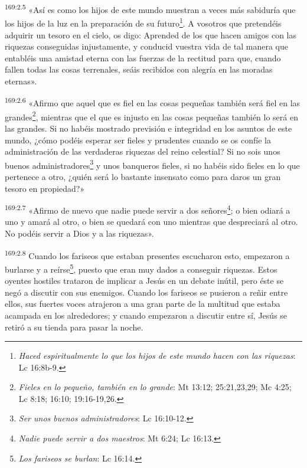 \par
\textsuperscript{169:2.5} «Así es como los hijos de este mundo muestran a veces más sabiduría que los hijos de la luz en la preparación de su futuro\footnote{\textit{Haced espiritualmente lo que los hijos de este mundo hacen con las riquezas}: Lc 16:8b-9.}. A vosotros que pretendéis adquirir un tesoro en el cielo, os digo: Aprended de los que hacen amigos con las riquezas conseguidas injustamente, y conducid vuestra vida de tal manera que entabléis una amistad eterna con las fuerzas de la rectitud para que, cuando fallen todas las cosas terrenales, seáis recibidos con alegría en las moradas eternas».

\par
\textsuperscript{169:2.6} «Afirmo que aquel que es fiel en las cosas pequeñas también será fiel en las grandes\footnote{\textit{Fieles en lo pequeño, también en lo grande}: Mt 13:12; 25:21,23,29; Mc 4:25; Lc 8:18; 16:10; 19:16-19,26.}, mientras que el que es injusto en las cosas pequeñas también lo será en las grandes. Si no habéis mostrado previsión e integridad en los asuntos de este mundo, ¿cómo podéis esperar ser fieles y prudentes cuando se os confíe la administración de las verdaderas riquezas del reino celestial? Si no sois unos buenos administradores\footnote{\textit{Ser unos buenos administradores}: Lc 16:10-12.} y unos banqueros fieles, si no habéis sido fieles en lo que pertenece a otro, ¿quién será lo bastante insensato como para daros un gran tesoro en propiedad?»

\par
\textsuperscript{169:2.7} «Afirmo de nuevo que nadie puede servir a dos señores\footnote{\textit{Nadie puede servir a dos maestros}: Mt 6:24; Lc 16:13.}; o bien odiará a uno y amará al otro, o bien se quedará con uno mientras que despreciará al otro. No podéis servir a Dios y a las riquezas».

\par
\textsuperscript{169:2.8} Cuando los fariseos que estaban presentes escucharon esto, empezaron a burlarse y a reírse\footnote{\textit{Los fariseos se burlan}: Lc 16:14.}, puesto que eran muy dados a conseguir riquezas. Estos oyentes hostiles trataron de implicar a Jesús en un debate inútil, pero éste se negó a discutir con sus enemigos. Cuando los fariseos se pusieron a reñir entre ellos, sus fuertes voces atrajeron a una gran parte de la multitud que estaba acampada en los alrededores; y cuando empezaron a discutir entre sí, Jesús se retiró a su tienda para pasar la noche.

